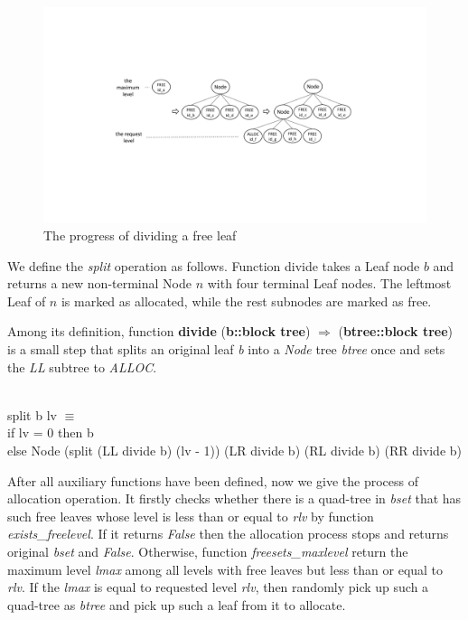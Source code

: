 \begin{figure}
	\centering
	\includegraphics[width=1\textwidth]{fig1.pdf}
	\caption{The progress of dividing a free leaf}
	\label{fig1}
\end{figure}

We define the \emph{split} operation as follows. 
Function divide takes a Leaf node $b$ and returns a new non-terminal Node $n$ with four terminal Leaf nodes. The leftmost Leaf of $n$ is marked as allocated, while the rest subnodes are marked as free.

Among its definition, function \textbf{divide} (\textbf{b::block tree}) $\Rightarrow$ (\textbf{btree::block tree}) is a small step that splits an original leaf \emph{b} into a \emph{Node} tree \emph{btree} once and sets the \emph{LL} subtree to \emph{ALLOC}.

\begin{definition}  \\
	split b lv $\equiv$ \\
	\phantom{x} \hspace{10pt} if lv = 0 then b \\
	\phantom{x} \hspace{10pt} else Node (split (LL divide b) (lv - 1)) (LR divide b) (RL divide b) (RR divide b)
\end{definition}

After all auxiliary functions have been defined, now we give the process of allocation operation. It firstly checks whether there is a quad-tree in \emph{bset} that has such free leaves whose level is less than or equal to \emph{rlv} by function \emph{exists\_freelevel}. If it returns \emph{False} then the allocation process stops and returns original \emph{bset} and \emph{False}. Otherwise, function \emph{freesets\_maxlevel} return the maximum level \emph{lmax} among all levels with free leaves but less than or equal to \emph{rlv}. If the \emph{lmax} is equal to requested level \emph{rlv}, then randomly pick up such a quad-tree as \emph{btree} and pick up such a leaf from it to allocate. 


